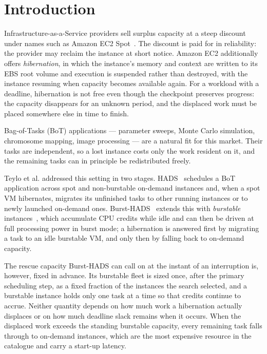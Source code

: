 \documentclass[conference]{IEEEtran}
\begin{document}
\section{Introduction}

Infrastructure-as-a-Service providers sell surplus capacity at a steep discount
under names such as Amazon EC2 Spot~\cite{aws}. The discount is paid for in reliability:
the provider may reclaim the instance at short notice. Amazon EC2 additionally
offers \emph{hibernation}, in which the instance's memory and context are
written to its EBS root volume and execution is suspended rather than
destroyed, with the instance resuming when capacity becomes available again.
For a workload with a deadline, hibernation is not free even though the
checkpoint preserves progress: the capacity disappears for an unknown period,
and the displaced work must be placed somewhere else in time to finish.

Bag-of-Tasks (BoT) applications --- parameter sweeps, Monte Carlo simulation,
chromosome mapping, image processing --- are a natural fit for this market.
Their tasks are independent, so a lost instance costs only the work resident on
it, and the remaining tasks can in principle be redistributed freely.

Teylo et al. addressed this setting in two stages. HADS~\cite{hads2021}
schedules a BoT application across spot and non-burstable on-demand instances
and, when a spot VM hibernates, migrates its unfinished tasks to other running
instances or to newly launched on-demand ones. Burst-HADS~\cite{bursthads}
extends this with \emph{burstable} instances~\cite{t3}, which accumulate CPU credits
while idle and can then be driven at full processing power in burst mode; a
hibernation is answered first by migrating a task to an idle burstable VM,
and only then by falling back to on-demand capacity.

The rescue capacity Burst-HADS can call on at the instant of an interruption
is, however, fixed in advance. Its burstable fleet is sized once, after the
primary scheduling step, as a fixed fraction of the instances the search
selected, and a burstable instance holds only one task at a time so that
credits continue to accrue. Neither quantity depends on how much work a
hibernation actually displaces or on how much deadline slack remains when it
occurs. When the displaced work exceeds the standing burstable capacity, every
remaining task falls through to on-demand instances, which are the most
expensive resource in the catalogue and carry a start-up latency.
\end{document}
